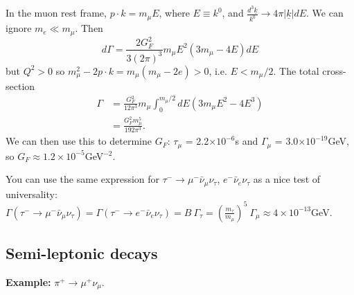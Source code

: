 \documentclass[a4paper,12pt]{article}
\begin{document}
In the muon rest frame, $p \cdot k = m_\mu E$, where $E \equiv k^0$, and $\frac{d^3\underline{k}}{k^0} \to 4\pi |\underline{k}|dE$. We can ignore $m_e \ll m_\mu$. Then
\begin{equation}
    d\Gamma = \frac{2G_F^2}{3(2\pi)^3} m_\mu E^2(3m_\mu - 4E)dE
\end{equation}
but $Q^2 > 0$ so $m_\mu^2 - 2p\cdot k = m_\mu(m_\mu - 2e) >0$, i.e. $E < m_\mu/2$. The total cross-section
\begin{equation}
\begin{split}
    \Gamma &= \frac{G_F^2}{12\pi^3} m_\mu \int_0^{m_\mu/2} dE (3m_\mu E^2 - 4E^3) \\
    &= \frac{G_F^2 m_\mu^5}{192 \pi^3}.
\end{split}
\end{equation}
We can then use this to determine $G_F$: $\tau_\mu$ = 2.2$\times 10^{-6}$s and $\Gamma_\mu$ = 3.0$\times 10^{-19}$GeV, so $G_F \approx 1.2\times 10^{-5}$GeV$^{-2}$. 

You can use the same expression for $\tau^- \to \mu^- \bar{\nu}_\mu \nu_\tau$, $e^- \bar{\nu}_e \nu_\tau$ as a nice test of universality: $\Gamma(\tau^- \to \mu^- \bar{\nu}_\mu \nu_\tau) = \Gamma(\tau^- \to e^- \bar{\nu}_e \nu_\tau) = B\ \Gamma_\tau = (\frac{m_\tau}{m_\mu})^5\ \Gamma_\mu \approx 4 \times 10^{-13}$GeV.

\subsection{Semi-leptonic decays}
\textbf{Example: } $\pi^+ \to \mu^+ \nu_\mu$.
\newline
\end{document}
